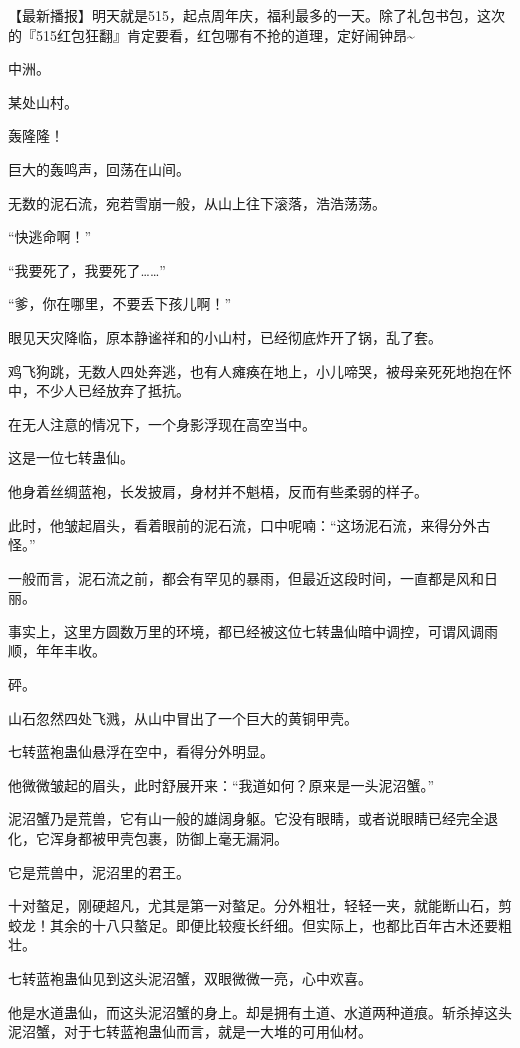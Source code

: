 
\begin{this_body}

【最新播报】明天就是515，起点周年庆，福利最多的一天。除了礼包书包，这次的『515红包狂翻』肯定要看，红包哪有不抢的道理，定好闹钟昂\~{}

中洲。

某处山村。

轰隆隆！

巨大的轰鸣声，回荡在山间。

无数的泥石流，宛若雪崩一般，从山上往下滚落，浩浩荡荡。

“快逃命啊！”

“我要死了，我要死了……”

“爹，你在哪里，不要丢下孩儿啊！”

眼见天灾降临，原本静谧祥和的小山村，已经彻底炸开了锅，乱了套。

鸡飞狗跳，无数人四处奔逃，也有人瘫痪在地上，小儿啼哭，被母亲死死地抱在怀中，不少人已经放弃了抵抗。

在无人注意的情况下，一个身影浮现在高空当中。

这是一位七转蛊仙。

他身着丝绸蓝袍，长发披肩，身材并不魁梧，反而有些柔弱的样子。

此时，他皱起眉头，看着眼前的泥石流，口中呢喃：“这场泥石流，来得分外古怪。”

一般而言，泥石流之前，都会有罕见的暴雨，但最近这段时间，一直都是风和日丽。

事实上，这里方圆数万里的环境，都已经被这位七转蛊仙暗中调控，可谓风调雨顺，年年丰收。

砰。

山石忽然四处飞溅，从山中冒出了一个巨大的黄铜甲壳。

七转蓝袍蛊仙悬浮在空中，看得分外明显。

他微微皱起的眉头，此时舒展开来：“我道如何？原来是一头泥沼蟹。”

泥沼蟹乃是荒兽，它有山一般的雄阔身躯。它没有眼睛，或者说眼睛已经完全退化，它浑身都被甲壳包裹，防御上毫无漏洞。

它是荒兽中，泥沼里的君王。

十对螯足，刚硬超凡，尤其是第一对螯足。分外粗壮，轻轻一夹，就能断山石，剪蛟龙！其余的十八只螯足。即便比较瘦长纤细。但实际上，也都比百年古木还要粗壮。

七转蓝袍蛊仙见到这头泥沼蟹，双眼微微一亮，心中欢喜。

他是水道蛊仙，而这头泥沼蟹的身上。却是拥有土道、水道两种道痕。斩杀掉这头泥沼蟹，对于七转蓝袍蛊仙而言，就是一大堆的可用仙材。


\end{this_body}
